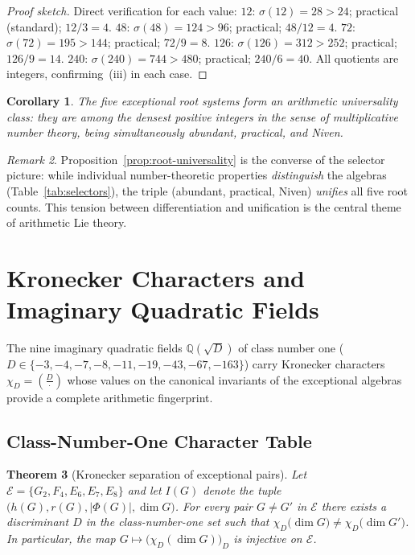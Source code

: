\documentclass[11pt]{amsart}
\theoremstyle{plain}
\newtheorem{theorem}{Theorem}[section]
\newtheorem{corollary}[theorem]{Corollary}
\theoremstyle{definition}
\theoremstyle{remark}
\newtheorem{remark}[theorem]{Remark}
\renewcommand{\Phi}{\varPhi}
\begin{document}
\begin{proof}[Proof sketch]
Direct verification for each value:
$12$: $\sigma(12)=28>24$; practical (standard); $12/3=4$.
$48$: $\sigma(48)=124>96$; practical; $48/12=4$.
$72$: $\sigma(72)=195>144$; practical; $72/9=8$.
$126$: $\sigma(126)=312>252$; practical; $126/9=14$.
$240$: $\sigma(240)=744>480$; practical; $240/6=40$.
All quotients are integers, confirming~(iii) in each case.
\end{proof}

\begin{corollary}
The five exceptional root systems form an \emph{arithmetic universality class}:
they are among the densest positive integers in the sense of multiplicative
number theory, being simultaneously abundant, practical, and Niven.
\end{corollary}

\begin{remark}
Proposition~\ref{prop:root-universality} is the converse of the selector
picture: while individual number-theoretic properties \emph{distinguish}
the algebras (Table~\ref{tab:selectors}), the triple
(abundant, practical, Niven) \emph{unifies} all five root counts.
This tension between differentiation and unification is the central theme
of arithmetic Lie theory.
\end{remark}


\section{Kronecker Characters and Imaginary Quadratic Fields}%
\label{sec:kronecker}

The nine imaginary quadratic fields $\mathbb{Q}(\sqrt{D})$ of class number one
($D \in \{-3,-4,-7,-8,-11,-19,-43,-67,-163\}$) carry Kronecker characters
$\chi_D = \left(\frac{D}{\cdot}\right)$ whose values on the canonical invariants
of the exceptional algebras provide a complete arithmetic fingerprint.

\subsection{Class-Number-One Character Table}\label{subsec:kronecker-table}

\begin{theorem}[Kronecker separation of exceptional pairs]
\label{thm:kronecker-separation}
Let $\mathcal{E} = \{G_2, F_4, E_6, E_7, E_8\}$ and let $I(G)$ denote
the tuple $\bigl(h(G), r(G), |\Phi(G)|, \dim G\bigr)$.
For every pair $G \neq G'$ in $\mathcal{E}$ there exists a discriminant
$D$ in the class-number-one set such that
$\chi_D\bigl(\dim G\bigr) \neq \chi_D\bigl(\dim G'\bigr)$.
In particular, the map $G \mapsto \bigl(\chi_D(\dim G)\bigr)_{D}$ is injective
on $\mathcal{E}$.
\end{theorem}
\end{document}
